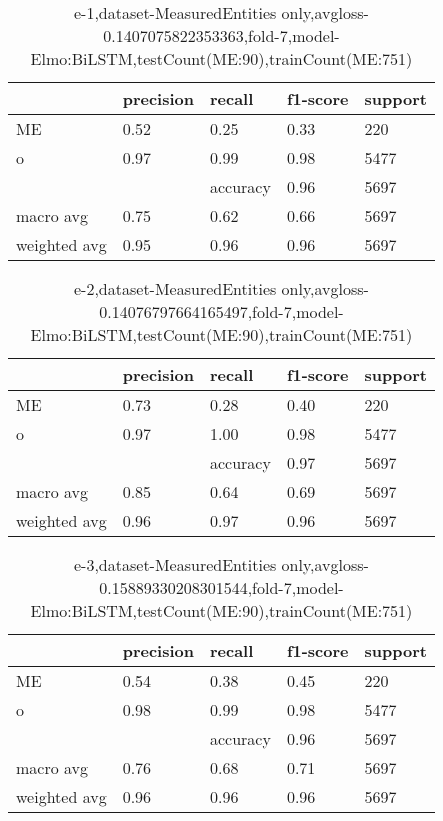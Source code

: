 \begin{table}[!ht] 
\centering
\caption{e-1,dataset-MeasuredEntities only,avgloss-0.1407075822353363,fold-7,model-Elmo:BiLSTM,testCount(ME:90),trainCount(ME:751)}\label{e-1data-meS.tsv}
\begin{tabularx}{300pt}{|X|X|X|X|X|}
\hline
&precision&recall&f1-score&support\\
\hline
ME&0.52&0.25&0.33&220\\
\hline
o&0.97&0.99&0.98&5477\\
\hline
&&accuracy&0.96&5697\\
\hline
macro avg&0.75&0.62&0.66&5697\\
\hline
weighted avg&0.95&0.96&0.96&5697\\
\hline
\end{tabularx}
\end{table}
\begin{table}[!ht] 
\centering
\caption{e-2,dataset-MeasuredEntities only,avgloss-0.14076797664165497,fold-7,model-Elmo:BiLSTM,testCount(ME:90),trainCount(ME:751)}\label{e-2data-meS.tsv}
\begin{tabularx}{300pt}{|X|X|X|X|X|}
\hline
&precision&recall&f1-score&support\\
\hline
ME&0.73&0.28&0.40&220\\
\hline
o&0.97&1.00&0.98&5477\\
\hline
&&accuracy&0.97&5697\\
\hline
macro avg&0.85&0.64&0.69&5697\\
\hline
weighted avg&0.96&0.97&0.96&5697\\
\hline
\end{tabularx}
\end{table}
\begin{table}[!ht] 
\centering
\caption{e-3,dataset-MeasuredEntities only,avgloss-0.15889330208301544,fold-7,model-Elmo:BiLSTM,testCount(ME:90),trainCount(ME:751)}\label{e-3data-meS.tsv}
\begin{tabularx}{300pt}{|X|X|X|X|X|}
\hline
&precision&recall&f1-score&support\\
\hline
ME&0.54&0.38&0.45&220\\
\hline
o&0.98&0.99&0.98&5477\\
\hline
&&accuracy&0.96&5697\\
\hline
macro avg&0.76&0.68&0.71&5697\\
\hline
weighted avg&0.96&0.96&0.96&5697\\
\hline
\end{tabularx}
\end{table}
